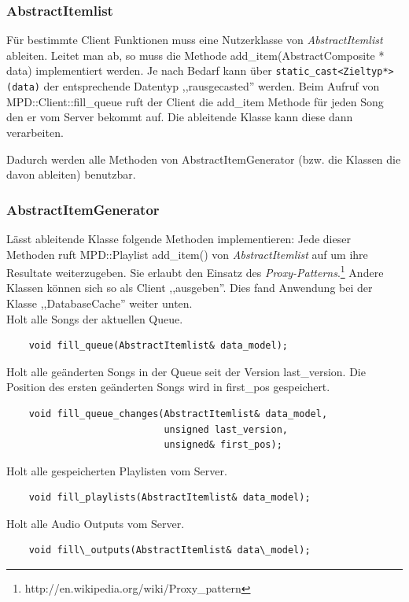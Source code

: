 \subsubsection{AbstractItemlist}
Für bestimmte Client Funktionen muss eine Nutzerklasse von \emph{AbstractItemlist} ableiten.
Leitet man ab, so muss die Methode add\_item(AbstractComposite * data) implementiert werden. 
Je nach Bedarf kann über \verb+static_cast<Zieltyp*>(data)+ der entsprechende Datentyp ,,rausgecasted'' werden.
Beim Aufruf von MPD::Client::fill\_queue ruft der Client die add\_item Methode für jeden 
Song den er vom Server bekommt auf. Die ableitende Klasse kann diese dann verarbeiten.

Dadurch werden alle Methoden von AbstractItemGenerator (bzw. die Klassen die davon ableiten) benutzbar.

\subsubsection{AbstractItemGenerator}
Lässt ableitende Klasse folgende Methoden implementieren:
Jede dieser Methoden ruft MPD::Playlist add\_item() von \emph{AbstractItemlist} auf um ihre Resultate weiterzugeben.
Sie erlaubt den Einsatz des \emph{Proxy-Patterns}.\footnote{http://en.wikipedia.org/wiki/Proxy\_pattern}
Andere Klassen können sich so als Client ,,ausgeben''.
Dies fand Anwendung bei der Klasse ,,DatabaseCache'' weiter unten.
\\
Holt alle Songs der aktuellen Queue.
\begin{verbatim}            
    void fill_queue(AbstractItemlist& data_model);
\end{verbatim}

Holt alle geänderten Songs in der Queue seit der Version last\_version. Die Position des ersten geänderten Songs wird in first\_pos gespeichert. 
\begin{verbatim}
    void fill_queue_changes(AbstractItemlist& data_model,
                            unsigned last_version,
                            unsigned& first_pos);
\end{verbatim}

Holt alle gespeicherten Playlisten vom Server.
\begin{verbatim}              
    void fill_playlists(AbstractItemlist& data_model);
\end{verbatim}

Holt alle Audio Outputs vom Server.
\begin{verbatim}
    void fill\_outputs(AbstractItemlist& data\_model);
\end{verbatim}

